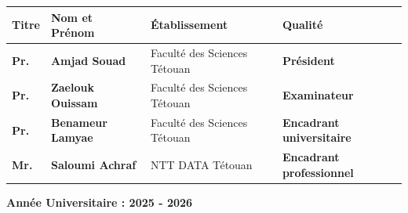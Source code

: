 \documentclass[12pt, a4paper, openany]{report}
\begin{document}
\begin{titlepage}
\noindent
\begin{tabular}{|l|l|l|l|}
  \hline
  \rowcolor{primaryBlue}
  \textbf{\color{white}Titre} &
  \textbf{\color{white}Nom et Prénom} &
  \textbf{\color{white}Établissement} &
  \textbf{\color{white}Qualité} \\
  \hline
  \rowcolor{lightBlue}
  \textbf{\color{primaryBlue}Pr.} &
  \textbf{\color{primaryBlue}Amjad Souad} &
  {\color{primaryBlue}\small Faculté des Sciences Tétouan} &
  {\color{primaryBlue}\bfseries Président} \\
  \hline
  \textbf{\color{primaryBlue}Pr.} &
  \textbf{\color{primaryBlue}Zaelouk Ouissam} &
  {\color{primaryBlue}\small Faculté des Sciences Tétouan} &
  {\color{primaryBlue}\bfseries Examinateur} \\
  \hline
  \rowcolor{lightBlue}
  \textbf{\color{primaryBlue}Pr.} &
  \textbf{\color{primaryBlue}Benameur Lamyae} &
  {\color{primaryBlue}\small Faculté des Sciences Tétouan} &
  {\color{primaryBlue}\bfseries Encadrant universitaire} \\
  \hline
  \textbf{\color{primaryBlue}Mr.} &
  \textbf{\color{primaryBlue}Saloumi Achraf} &
  {\color{primaryBlue}\small NTT DATA Tétouan} &
  {\color{primaryBlue}\bfseries Encadrant professionnel} \\
  \hline
\end{tabular}

\vspace{0.2cm}

\begin{center}
  {\fontsize{14}{16}\selectfont\color{royalBlue}\bfseries Année Universitaire : 2025 - 2026\par}
\end{center}

\vspace{0.0cm}


\end{titlepage}
\ClearShipoutPictureBG

\setcounter{page}{2}
\end{document}
